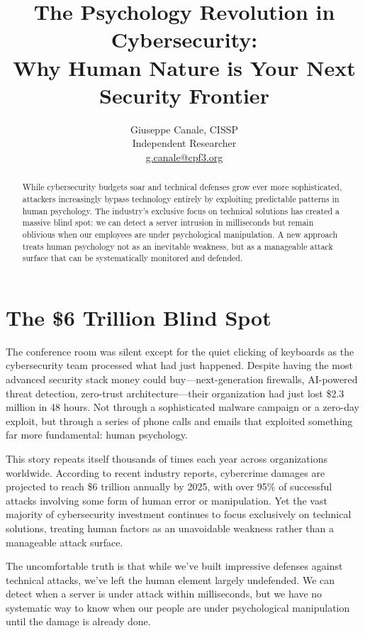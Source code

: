 \documentclass[10pt, twocolumn]{article}
\title{\LARGE The Psychology Revolution in Cybersecurity:\\Why Human Nature is Your Next Security Frontier}
\author{
\large Giuseppe Canale, CISSP\\
\normalsize Independent Researcher\\
\normalsize \href{mailto:g.canale@cpf3.org}{g.canale@cpf3.org}
}
\date{}
\begin{document}
\maketitle

\begin{abstract}
While cybersecurity budgets soar and technical defenses grow ever more sophisticated, attackers increasingly bypass technology entirely by exploiting predictable patterns in human psychology. The industry's exclusive focus on technical solutions has created a massive blind spot: we can detect a server intrusion in milliseconds but remain oblivious when our employees are under psychological manipulation. A new approach treats human psychology not as an inevitable weakness, but as a manageable attack surface that can be systematically monitored and defended.
\end{abstract}

\section{The \$6 Trillion Blind Spot}

The conference room was silent except for the quiet clicking of keyboards as the cybersecurity team processed what had just happened. Despite having the most advanced security stack money could buy—next-generation firewalls, AI-powered threat detection, zero-trust architecture—their organization had just lost \$2.3 million in 48 hours. Not through a sophisticated malware campaign or a zero-day exploit, but through a series of phone calls and emails that exploited something far more fundamental: human psychology.

This story repeats itself thousands of times each year across organizations worldwide. According to recent industry reports, cybercrime damages are projected to reach \$6 trillion annually by 2025, with over 95\% of successful attacks involving some form of human error or manipulation. Yet the vast majority of cybersecurity investment continues to focus exclusively on technical solutions, treating human factors as an unavoidable weakness rather than a manageable attack surface.

The uncomfortable truth is that while we've built impressive defenses against technical attacks, we've left the human element largely undefended. We can detect when a server is under attack within milliseconds, but we have no systematic way to know when our people are under psychological manipulation until the damage is already done.
\end{document}
